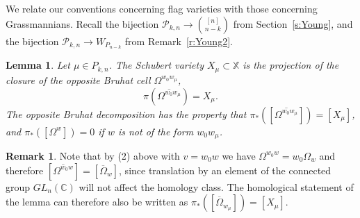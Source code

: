 \documentclass{amsart}
\newtheorem{lem}[thm]{Lemma}
\theoremstyle{definition}
\newtheorem{remark}[thm]{Remark}
\numberwithin{equation}{section}
\newcommand{\C}{\mathbb{C}}
\begin{document}
We relate our conventions concerning flag varieties with those concerning Grassmannians.  Recall the bijection $\mathcal P_{k,n}\to{{[n]}\choose{n-k}}$ from Section~\ref{s:Young}, and the bijection $\mathcal P_{k,n}\to W_{P_{n-k}}$ from Remark~\ref{r:Young2}.

\begin{lem}\label{l:ProjSchub}
Let $\mu\in P_{k,n}$. The Schubert variety $X_\mu\subset\mathbb X$ is the projection of the closure of the opposite Bruhat cell $\Omega^{w_0w_\mu}$, 
\[
\pi(\overline{\Omega^{w_0w_\mu}}
)=X_\mu.
\]
The opposite Bruhat decomposition has the property that $\pi_*([\overline{\Omega^{w_0w_\mu}}])=[X_\mu]$, and $\pi_*([\Omega^{w}])=0$ if $w$ is not of the form $w_0w_\mu$.  
\end{lem}
\begin{remark}\label{r:cohproj} Note that by (2) above with $v=w_0w$ we have $\Omega^{w_0w}=w_0\Omega_{w}$ and therefore $[\overline{\Omega^{w_0w}}]=[\overline{\Omega}_{w}]$, since translation by an element of the connected group $GL_n(\C)$ will not affect the homology class. The homological statement of the lemma can therefore also be written as $\pi_*([\overline{\Omega}_{w_{\mu}}])=[X_\mu]$. 
\end{remark}
\end{document}
